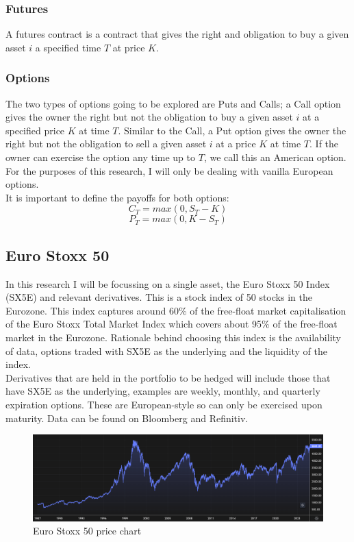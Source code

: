 \documentclass[12pt]{article}
\numberwithin{equation}{section}
\begin{document}
\subsubsection{Futures}
A futures contract is a contract that gives the right and obligation to buy a 
given asset $i$ a specified time $T$ at price $K$. 
\subsubsection{Options}
The two types of options going to be explored are Puts and Calls; a Call option 
gives the owner the right but not the obligation to buy a given asset $i$ at 
a specified price $K$ at time $T$. Similar to the Call, a Put option gives the 
owner the right but not the obligation to sell a given asset $i$ at a price $K$ 
at time $T$. If the owner can exercise the option any time up to $T$, we call 
this an American option. For the purposes of this research, I will only be 
dealing with vanilla European options.\\ 
It is important to define the payoffs for both options: 
\begin{equation}
C_T = max(0,S_T-K)
\end{equation}
\begin{equation}
P_T = max(0,K-S_T)
\end{equation}



\subsection{Euro Stoxx 50}
In this research I will be focussing on a single asset, the Euro Stoxx 50 Index
(SX5E) and relevant derivatives. This is a stock index of 50 stocks in the Eurozone. 
This index captures around 60\% of the free-float market capitalisation of the 
Euro Stoxx Total Market Index which covers about 95\% of the free-float market 
in the Eurozone.\autocite{a2021_euro} Rationale behind choosing this index is the availability of data,
options traded with SX5E as the underlying and the liquidity of the index.
\\
Derivatives that are held in the portfolio to be hedged will include those that 
have SX5E as the underlying, examples are weekly, monthly, and quarterly
expiration options. These are European-style so can only be exercised upon 
maturity. Data can be found on Bloomberg\autocite{bloomberg_2023_bloomberg} and Refinitiv.
\autocite{lseg} 
\begin{figure}[h]
    \centering
    \includegraphics[scale=0.35]{sx5e.png}
    \caption{Euro Stoxx 50 price chart}
\end{figure}
\end{document}
